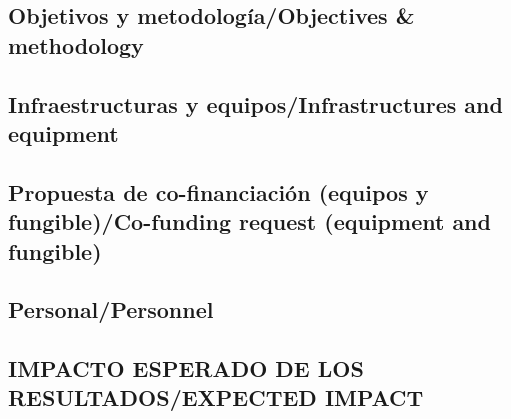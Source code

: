 \documentclass[a4paper,11pt,oneside]{article}
\begin{document}


\subsection*{\sc Objetivos y metodología/Objectives \& methodology}








%

\subsection*{\sc Infraestructuras y equipos/Infrastructures and equipment}


%
\subsection*{\sc Propuesta de co-financiación (equipos y fungible)/Co-funding request (equipment and fungible) }


\subsection*{\sc Personal/Personnel}


\subsection{\sc IMPACTO ESPERADO DE LOS RESULTADOS/EXPECTED IMPACT}

%
%
%
%
\end{document}
